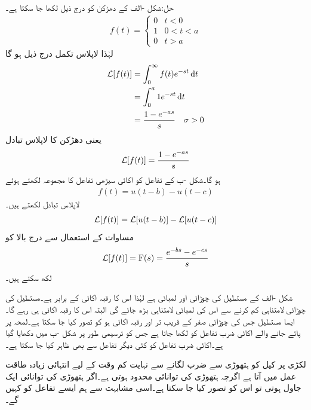 حل:شکل -الف کے دھڑکن کو درج ذیل لکھا جا سکتا ہے۔
\begin{align}
f(t)=
\begin{cases}
0& t<0\\
1& 0<t<a\\
0& t>a
\end{cases}
\end{align}
لہٰذا لاپلاس تکمل درج ذیل ہو گا
\begin{align*}
\Laplace[f(t)]&=\int_0^{\infty} f(t) e^{-st} \dif t\\
&=\int_0^a 1e^{-st} \dif t\\
&=\frac{1-e^{-as}}{s} \quad \sigma >0
\end{align*}
یعنی دھڑکن کا لاپلاس تبادل
\begin{align}
\mathcal{L}[f(t)]=\frac{1-e^{-as}}{s}
\end{align}
ہو گا۔شکل -ب کے تفاعل کو اکائی سیڑھی تفاعل کا مجموعہ لکھتے ہوئے
\begin{align*}
f(t)=u(t-b)-u(t-c)
\end{align*} 
لاپلاس تبادل لکھتے ہیں۔
\begin{align*}
\mathcal{L}[f(t)]=\mathcal{L}[u(t-b)]-\mathcal{L}[u(t-c)]
\end{align*}
مساوات  کے استعمال سے درج بالا کو 
\begin{align}
\mathcal{L}[f(t)]={{\textup{F}}}(s)=\frac{e^{-bs}-e^{-cs}}{s}
\end{align}
لکھ سکتے ہیں۔

شکل -الف کے مستطیل کی چوڑائی  اور لمبائی  ہے لہٰذا اس کا رقبہ 
 اکائی کے برابر ہے۔مستطیل کی چوڑائی لامتناہی کم  کرنے سے اس کی لمبائی لامتناہی بڑھ  جائے گی البتہ اس کا رقبہ اکائی ہی رہے گا۔ایسا مستطیل جس کی چوڑائی صفر کے قریب تر اور رقبہ اکائی ہو کو  تصور کیا جا سکتا ہے۔لمحہ  پر پائے جانے والے اکائی ضرب تفاعل کو  لکھا جاتا ہے جس کو ترسیمی طور پر شکل -ب میں دکھایا گیا ہے۔اکائی ضرب تفاعل کو کئی دیگر تفاعل سے بھی ظاہر کیا جا سکتا ہے۔

لکڑی پر کیل کو ہتھوڑی سے ضرب لگانے سے نہایت کم وقت کے لیے انتہائی زیادہ طاقت عمل میں آتا ہے اگرچہ ہتھوڑی کی توانائی محدود ہوتی ہے۔اگر ہتھوڑی کی توانائی ایک جاول ہوتی تو اس کو  تصور کیا جا سکتا ہے۔اسی مشابہت سے ہم ایسے تفاعل کو  کہیں گے۔

